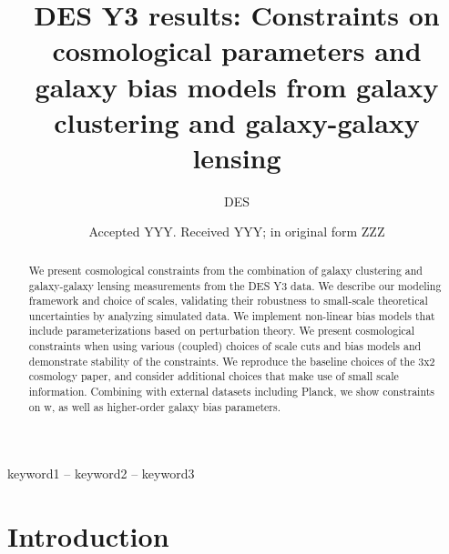 \documentclass[fleqn,usenatbib]{mnras}
\title[Short title, max. 45 characters]{DES Y3 results: Constraints on cosmological parameters and galaxy bias models from galaxy clustering and galaxy-galaxy lensing}
\author[DES et al.]{
DES
}
\date{Accepted YYY. Received YYY; in original form ZZZ}
\newcommand{\IR}[1]{{\color{red}[\textbf{Note for IR}: #1]}}
\begin{document}
\label{firstpage}
\pagerange{\pageref{firstpage}--\pageref{lastpage}}
\maketitle

\begin{abstract}
We present cosmological constraints from the combination of galaxy clustering and galaxy-galaxy lensing measurements from the DES Y3 data. We describe our modeling framework and choice of scales, validating their robustness to small-scale theoretical uncertainties by analyzing simulated data. We implement non-linear bias models that include parameterizations based on perturbation theory. We present cosmological constraints when using various (coupled) choices of scale cuts and bias models and demonstrate stability of the constraints. We reproduce the baseline choices of the 3x2 cosmology paper, and consider additional choices that make use of small scale information.  Combining with external datasets including Planck, we show constraints on w, as well as higher-order galaxy bias parameters. 
\end{abstract}

\begin{keywords}
keyword1 -- keyword2 -- keyword3
\end{keywords}



\section{Introduction}
\label{sec:intro}
\end{document}
